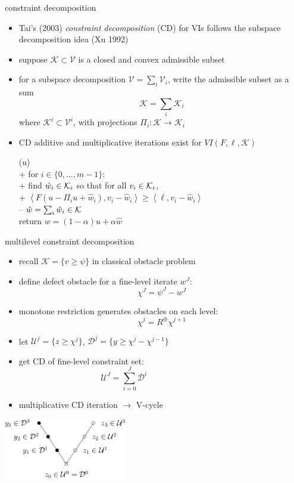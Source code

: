 \documentclass[svgnames,
               hyperref={colorlinks,citecolor=DeepPink4,linkcolor=FireBrick,urlcolor=Maroon},
               usepdftitle=false]  %
               {beamer}
\newcommand{\ip}[2]{\left<#1,#2\right>}
\begin{document}
\begin{frame}{constraint decomposition}

\begin{itemize}
\item Tai's (2003) \emph{constraint decomposition} (CD) for VIs follows the subspace decomposition idea (Xu 1992)
\item suppose $\mathcal{K} \subset \mathcal{V}$ is a closed and convex admissible subset
\item for a subspace decomposition $\mathcal{V} = \sum_i \mathcal{V}_i$, write the admissible subset as a sum
    $$\mathcal{K} = \sum_i \mathcal{K}_i$$
where $\mathcal{K}^i \subset \mathcal{V}^i$, with projections $\Pi_i : \mathcal{K} \to \mathcal{K}_i$
\item CD additive and multiplicative iterations exist for $VI(F,\ell,\mathcal{K})$

\begin{pseudo}
(u)\text{:} \\+
    for $i \in \{0,\dots,m-1\}$: \\+
        \rm{find} $\hat w_i\in \mathcal{K}_i$ \rm{so that for all} $v_i\in \mathcal{K}_i$, \\+
            $\boxed{\ip{F(u - \Pi_i u + \hat w_i)}{v_i-\hat w_i} \ge \ip{\ell}{v_i-\hat w_i}}$ \\--
    $\hat w = \sum_i \hat w_i\in\mathcal{K}$ \\
    return $w=(1-\alpha) u + \alpha \hat w$
\end{pseudo}
\end{itemize}
\end{frame}


\begin{frame}{multilevel constraint decomposition}

\begin{itemize}
\item recall $\mathcal{K} = \{v \ge \psi\}$ in classical obstacle problem
\item define \alert{defect obstacle} for a fine-level iterate $w^J$:
    $$\chi^J = \psi^J - w^J$$
\item \alert{monotone restriction} generates obstacles on each level:
	$$\chi^j = R^{\oplus} \chi^{j+1}$$
\item let $\mathcal{U}^j = \{z \ge \chi^j\}$, $\mathcal{D}^j = \{y \ge \chi^j - \chi^{j-1}\}$
\item get CD of fine-level constraint set:
	$$\mathcal{U}^J = \sum_{i=0}^J \mathcal{D}^i \phantom{KLDFJSKJDS SDF}$$
\item multiplicative CD iteration $\to$ V-cycle
\end{itemize}

\vspace{-25mm}
\hfill \includegraphics[width=0.4\textwidth]{../talk-oxford/images/fascd-vcycle.png}
\end{frame}
\end{document}
